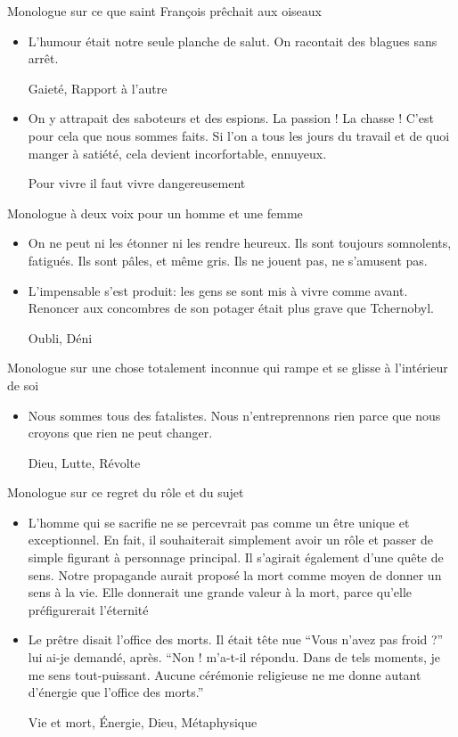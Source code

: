 \documentclass[french,a4paper,11pt,answers]{exam}
\newcommand{\cit}[2]{\og #1 \fg{} \begin{solution}{ #2 }\end{solution}} %
\begin{document}
    \begin{cadre}{Monologue sur ce que saint François prêchait aux oiseaux}
	\begin{itemize}
	    \item \cit{L'humour était notre seule planche de salut. On racontait des blagues sans arrêt.}
		{Gaieté, Rapport à l'autre}
	    \item \cit {On y attrapait des saboteurs et des espions. La passion ! La chasse ! C'est pour cela que nous sommes faits. Si l'on a tous les jours du travail et de quoi manger à satiété, cela devient incorfortable, ennuyeux.}
		{Pour vivre il faut vivre dangereusement}
	\end{itemize}
    \end{cadre}

    \begin{cadre}{Monologue à deux voix pour un homme et une femme}
	\begin{itemize}
	    \item \cit{On ne peut ni les étonner ni les rendre heureux. Ils sont toujours somnolents, fatigués. Ils sont pâles, et même gris. Ils ne jouent pas, ne s'amusent pas.}
		{}
	    \item \cit{L'impensable s'est produit: les gens se sont mis à vivre comme avant. Renoncer aux concombres de son potager était plus grave que Tchernobyl.}
		{Oubli, Déni}
	\end{itemize}
    \end{cadre}

    \begin{cadre}{Monologue sur une chose totalement inconnue qui rampe et se glisse à l'intérieur de soi}
	\begin{itemize}
	    \item \cit{Nous sommes tous des fatalistes. Nous n'entreprennons rien parce que nous croyons que rien ne peut changer.}
		{Dieu, Lutte, Révolte}
	\end{itemize}
    \end{cadre}

    \begin{cadre}{Monologue sur ce regret du rôle et du sujet}
	\begin{itemize}
	    \item \cit{L'homme qui se sacrifie ne se percevrait pas comme un être unique et exceptionnel. En fait, il souhaiterait simplement avoir un rôle et passer de simple figurant à personnage principal. Il s'agirait également d'une quête de sens. Notre propagande aurait proposé la mort comme moyen de donner un sens à la vie. Elle donnerait une grande valeur à la mort, parce qu'elle préfigurerait l'éternité}
		{}
	    \item \cit{Le prêtre disait l'office des morts. Il était tête nue  “Vous n'avez pas froid ?'' lui ai-je demandé, après.  “Non ! m'a-t-il répondu. Dans de tels moments, je me sens tout-puissant. Aucune cérémonie religieuse ne me donne autant d'énergie que l'office des morts.''}
		{Vie et mort, Énergie, Dieu, Métaphysique}
	\end{itemize}
    \end{cadre}
\end{document}
